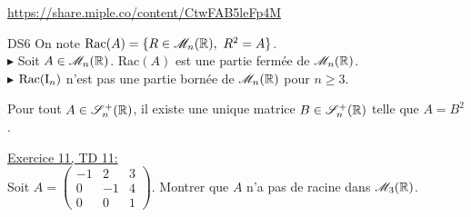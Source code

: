 \url{https://share.miple.co/content/CtwFAB5leFp4M}

\begin{box_titre}{DS6}
    On note $\mathrm{Rac}(A) = \{ R \in \mathscr{M}_n(\mathbb{R}),\ R^2 = A \}$. \\
    $\blacktriangleright$ Soit $A \in \mathscr{M}_n(\mathbb{R})$. $\mathrm{Rac}(A)$ est une partie fermée de $\mathscr{M}_n(\mathbb{R})$. \\
    $\blacktriangleright$ $\mathrm{Rac}(\mathrm{I}_n)$ n'est pas une partie bornée de $\mathscr{M}_n(\mathbb{R})$ pour $n \geqslant 3$. 
\end{box_titre}

\begin{prop}
    Pour tout $A \in \mathscr{S}_n^+(\mathbb{R})$, il existe une unique matrice $B \in \mathscr{S}_n^+(\mathbb{R})$ telle que $A = B^2$. 
\end{prop}

\begin{exercice}
    \underline{Exercice 11, TD 11:}\\
    Soit $A = 
    \begin{pmatrix}
        -1 & 2 & 3 \\
        0 & - 1 & 4 \\
        0 & 0 & 1
    \end{pmatrix}. 
    $ Montrer que $A$ n'a pas de racine dans $\mathscr{M}_3(\mathbb{R})$. 
\end{exercice}
